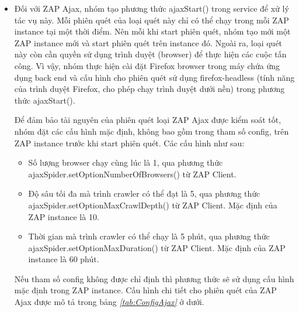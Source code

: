 \begin{itemize}
  \item Đối với ZAP Ajax, nhóm tạo phương thức ajaxStart() trong service để xử lý tác vụ này. Mỗi phiên quét của loại quét này chỉ có thể chạy trong mỗi ZAP instance tại một thời điểm. Nên mỗi khi start phiên quét, nhóm tạo mới một ZAP instance mới và start phiên quét trên instance đó. Ngoài ra, loại quét này còn cần quyền sử dụng trình duyệt (browser) để thực hiện các cuộc tấn công. Vì vậy, nhóm thực hiện cài đặt Firefox browser trong máy chứa ứng dụng back end và cấu hình cho phiên quét sử dụng firefox-headless (tính năng của trình duyệt Firefox, cho phép chạy trình duyệt dưới nền) trong phương thức ajaxStart().
        
  Để đảm bảo tài nguyên của phiên quét loại ZAP Ajax được kiểm soát tốt, nhóm đặt các cấu hình mặc định, không bao gồm trong tham số config, trên ZAP instance trước khi start phiên quét. Các cấu hình như sau:
        \begin{itemize}
          \item Số lượng browser chạy cùng lúc là 1, qua phương thức \\
                ajaxSpider.setOptionNumberOfBrowsers() từ ZAP Client.
          \item Độ sâu tối đa mà trình crawler có thể đạt là 5, qua phương thức \\
                ajaxSpider.setOptionMaxCrawlDepth() từ ZAP Client. Mặc định của ZAP instance là 10.
          \item Thời gian mà trình crawler có thể chạy là 5 phút, qua phương thức \\
                ajaxSpider.setOptionMaxDuration() từ ZAP Client. Mặc định của ZAP instance là 60 phút.
        \end{itemize}
        Nếu tham số config không được chỉ định thì phương thức sẽ sử dụng cấu hình mặc định trong ZAP instance.
        Cấu hình chi tiết cho phiên quét của ZAP Ajax được mô tả trong bảng \textit{\ref{tab:ConfigAjax} } ở dưới.


\end{itemize}
